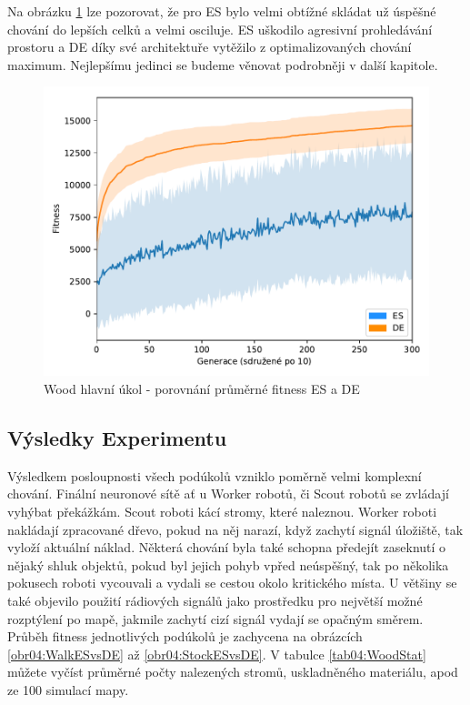 	Na obrázku \ref{obr04:CoopESvsDE} lze pozorovat, že pro ES bylo velmi obtížné skládat už úspěšné chování do lepších celků a velmi osciluje. ES uškodilo agresivní prohledávání prostoru a DE díky své architektuře vytěžilo z optimalizovaných chování maximum. Nejlepšímu jedinci se budeme věnovat podrobněji v další kapitole. 
		\clearpage
		\begin{figure}[t]\centering
		\includegraphics[width=\columnwidth]{../img/WoodMap/DEvsES/WoodCoopMem}
		\caption{Wood hlavní úkol  - porovnání průměrné fitness ES a DE}
		\label{obr04:CoopESvsDE}
	\end{figure}
	\newpage
	
	\subsection*{Výsledky Experimentu}
	Výsledkem posloupnosti všech podúkolů vzniklo poměrně velmi komplexní chování. Finální neuronové sítě ať u Worker robotů, či Scout robotů se zvládají vyhýbat překážkám. Scout roboti kácí stromy, které naleznou. Worker roboti nakládají zpracované dřevo, pokud na něj narazí, když zachytí signál úložiště, tak vyloží aktuální náklad. Některá chování byla také schopna předejít zaseknutí o nějaký shluk objektů, pokud byl  jejich pohyb vpřed neúspěšný, tak po několika pokusech roboti vycouvali a vydali se cestou okolo kritického místa. U většiny se také objevilo použití rádiových signálů jako prostředku pro největší možné rozptýlení po mapě, jakmile zachytí cizí signál vydají se opačným směrem. Průběh fitness jednotlivých podúkolů je zachycena na obrázcích \ref{obr04:WalkESvsDE} až \ref{obr04:StockESvsDE}. V tabulce \ref{tab04:WoodStat} můžete vyčíst průměrné počty nalezených stromů, uskladněného materiálu, apod ze 100 simulací mapy. 
	
